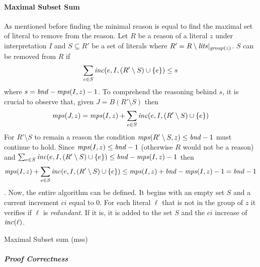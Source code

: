 \paragraph{Maximal Subset Sum}
As mentioned before finding the minimal reason is 
equal to find the maximal set of literal to remove from the reason.
Let $R$ be a reason of a literal $z$ under interpretation $I$ and
$S \subseteq R'$ be a set of literals where $R' = R\setminus\mathit{lits}|_{\mathit{group}(z)}$.
$S$ can be removed from $R$ if 
$$\sum_{e \in S}\mathit{inc}(e,I,(R'\setminus S) \cup \{e\}) \le s $$
where $s = \mathit{bnd} - \mathit{mps}(I,z) - 1$.
To comprehend the reasoning behind $s$, it is crucial to observe that, 
given $J = B(R'\setminus S)$ 
then $$\mathit{mps}(J,z) = \mathit{mps}(I,z) + \sum_{e \in S}\mathit{inc}(e,I,(R'\setminus S) \cup \{e\})$$
For $R'\setminus S$ to remain a reason
the condition $\mathit{mps}(R'\setminus S,z) \le \mathit{bnd} - 1$
must continue to hold.
Since $\mathit{mps}(I,z) \le \mathit{bnd} - 1 $ (otherwise $R$ would not be a reason)
and $\sum_{e \in S}\mathit{inc}(e,I,(R'\setminus S) \cup \{e\}) \le \mathit{bnd} - \mathit{mps}(I,z) - 1$
then $$\mathit{mps}(I,z) + 
\sum_{e \in S}\mathit{inc}(e,I,(R'\setminus S) \cup \{e\}) \le \mathit{mps}(I,z) + 
\mathit{bnd} - \mathit{mps}(I,z) - 1 = \mathit{bnd} - 1$$.
Now, the entire algorithm can be defined. 
It begins with an empty set $S$ and a current increment $ci$
equal to 0. For each literal $\ell$ that is not in the group 
of $z$ it verifies if $\ell$ is \textit{redundant}.
If it is, it is added to the set $S$ and the $ci$
increase of $\mathit{inc}(\ell)$. 
\begin{algorithm}[h]\small
    \caption{Maximal Subset sum (mss)}
    \label{alg:maximal_subset}
\end{algorithm}

\subparagraph{Proof Correctness}

